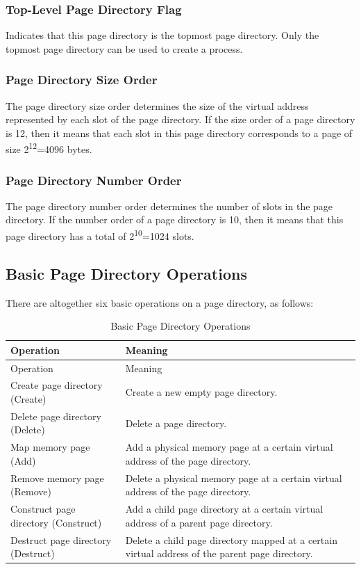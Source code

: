 \subsubsection{Top-Level Page Directory Flag}\label{subsubsec:3-top-level-page-directory-flag}

Indicates that this page directory is the topmost page directory. Only the topmost page directory can be used to create a process.

\subsubsection{Page Directory Size Order}\label{subsubsec:3-page-directory-size-order}

The page directory size order determines the size of the virtual address represented by each slot of the page directory. If the size order of a page directory is 12, then it means that each slot in this page directory corresponds to a page of size 2\textsuperscript{12}=4096 bytes.

\subsubsection{Page Directory Number Order}\label{subsubsec:3-page-directory-number-order}

The page directory number order determines the number of slots in the page directory. If the number order of a page directory is 10, then it means that this page directory has a total of 2\textsuperscript{10}=1024 slots.

\subsection{Basic Page Directory Operations}\label{subsec:3-basic-page-directory-operations}

There are altogether six basic operations on a page directory, as follows:

\begin{xltabular}{\textwidth}{@{}>{\hsize\raggedright\arraybackslash}X>{\hsize\raggedright\arraybackslash}X@{}}
\caption{Basic Page Directory Operations}\label{tab:3-3-basic-page-directory-operations}\\
\toprule
Operation & Meaning\tabularnewline
\endfirsthead
\toprule
Operation & Meaning\tabularnewline
\midrule
\endhead
\bottomrule
\endlastfoot
Create page directory (Create) & Create a new empty page directory.\tabularnewline
Delete page directory (Delete) & Delete a page directory.\tabularnewline
Map memory page (Add) &
Add a physical memory page at a certain virtual address of the page directory.\tabularnewline
Remove memory page (Remove) &
Delete a physical memory page at a certain virtual address of the page directory.\tabularnewline
Construct page directory (Construct) &
Add a child page directory at a certain virtual address of a parent page directory.\tabularnewline
Destruct page directory (Destruct) &
Delete a child page directory mapped at a certain virtual address of the parent page directory.\tabularnewline
\end{xltabular}
\nopagebreak[4]

